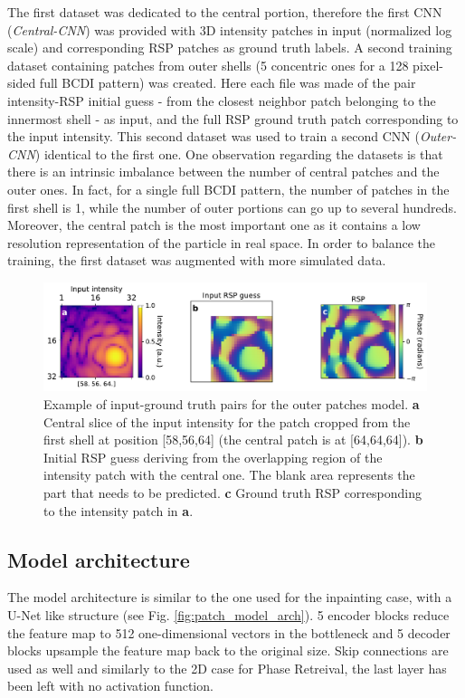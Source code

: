 The first dataset was dedicated to the central portion, therefore the first CNN (\textit{Central-CNN}) was provided with 3D intensity patches in 
input (normalized log scale) and corresponding RSP patches as ground truth labels. A second training dataset containing 
patches from outer shells (5 concentric ones for a 128 pixel-sided full BCDI pattern) was created. Here each file was made 
of the pair intensity-RSP initial guess - from the closest neighbor patch belonging to the innermost shell -  as input,
and the full RSP ground truth patch corresponding to the input intensity. This second dataset was used to train a second 
CNN (\textit{Outer-CNN}) identical to the first one. One observation regarding the datasets is that there is an intrinsic imbalance between the 
number of central patches and the outer ones. In fact, for a single full BCDI pattern, the number of patches in the first shell is 1, 
while the number of outer portions can go up to several hundreds. Moreover, the central patch is the most important one as it 
contains a low resolution representation of the particle in real space. In order to balance the training, the first dataset was 
augmented with more simulated data. 

\begin{figure}[H]
    \centering
    \includegraphics[width=\textwidth]{figures/Phasing/guess_RSP.pdf}
    \caption{Example of input-ground truth pairs for the outer patches model. \textbf{a} Central slice of the input intensity 
    for the patch cropped from the first shell at position [58,56,64] (the central patch is at [64,64,64]). \textbf{b} Initial 
    RSP guess deriving from the overlapping region of the intensity patch with the central one. The blank area represents 
    the part that needs to be predicted. \textbf{c} Ground truth RSP corresponding to the intensity patch in \textbf{a}.}
    
    \label{fig:patches_Xy}

\end{figure}

\subsection{Model architecture}\label{chp:3d_patch_model} 
The model architecture is similar to the one used for the inpainting case, with a U-Net like structure (see Fig. \ref{fig:patch_model_arch}). 
5 encoder blocks reduce the feature map to 512 one-dimensional vectors in the bottleneck and 5 decoder blocks upsample 
the feature map back to the original size. Skip connections are used as well and similarly to the 2D case for Phase Retreival, 
the last layer has been left with no activation function. 

